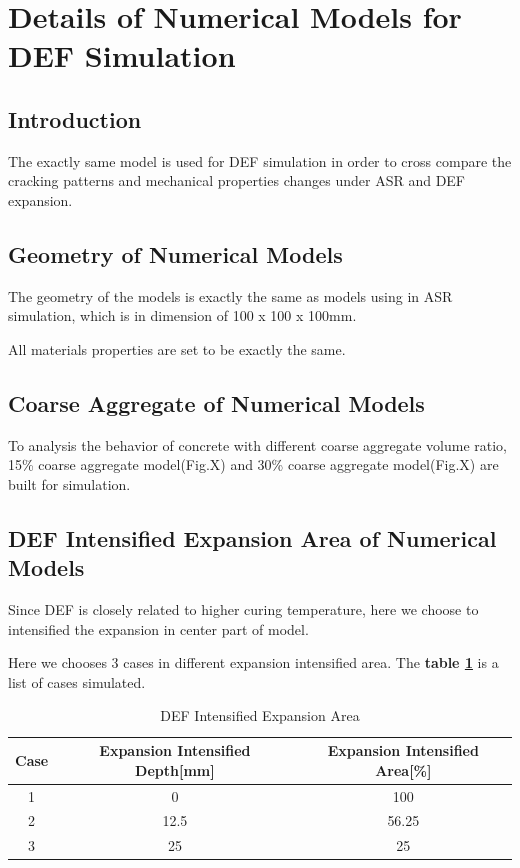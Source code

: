 \section{Details of Numerical Models for DEF Simulation}

\subsection{Introduction}

The exactly same model is used for DEF simulation in order to cross compare the cracking patterns and mechanical properties changes under ASR and DEF expansion.

\subsection{Geometry of Numerical Models}

The geometry of the models is exactly the same as models using in ASR simulation, which is in dimension of 100 x 100 x 100mm.

All materials properties are set to be exactly the same.

\subsection{Coarse Aggregate of Numerical Models}

To analysis the behavior of concrete with different coarse aggregate volume ratio, 15\% coarse aggregate model(Fig.X) and 30\% coarse aggregate model(Fig.X) are built for simulation.

\subsection{DEF Intensified Expansion Area of Numerical Models}

Since DEF is closely related to higher curing temperature, here we choose to intensified the expansion in center part of model.

Here we chooses 3 cases in different expansion intensified area. The \textbf{table \ref{table:DEF_X}} is a list of cases simulated.

\begin{table}[ht!]
\centering
\begin{tabular}{||c c c||}
 \hline
 Case &  Expansion Intensified Depth[mm] &  Expansion Intensified Area[\%] \\ [0.5ex]
 \hline\hline
 1 & 0 & 100 \\
 2 & 12.5 & 56.25 \\
 3 & 25 & 25 \\ [0.5ex]
 \hline
\end{tabular}
\caption{DEF Intensified Expansion Area}
\label{table:DEF_X}
\end{table}

